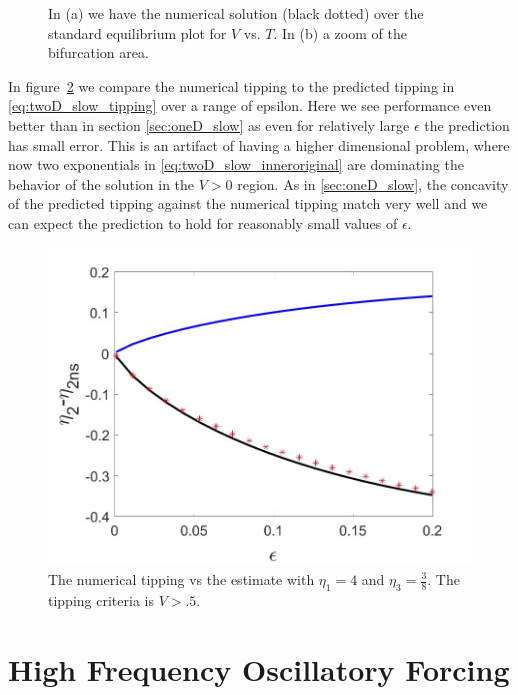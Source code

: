 \begin{figure}[H]
\begin{subfigure}{.5\textwidth}
  \caption{}
\end{subfigure}
\caption{In (a) we have the numerical solution (black dotted) over the standard equilibrium plot for $V$ vs. $T$. In (b) a zoom of the bifurcation area.}
\label{fig:twoD_slow_Tnumerics}
\end{figure}

In figure~\ref{fig:twoD_slow_epscomp} we compare the numerical tipping to the predicted tipping in \eqref{eq:twoD_slow_tipping} over a range of epsilon. Here we see performance even better than in section \autoref{sec:oneD_slow} as even for relatively large $\epsilon$ the prediction has small error. This is an artifact of having a higher dimensional problem, where now two exponentials in \eqref{eq:twoD_slow_inneroriginal} are dominating the behavior of the solution in the $V>0$ region. As in \autoref{sec:oneD_slow}, the concavity of the predicted tipping against the numerical tipping match very well and we can expect the prediction to hold for reasonably small values of $\epsilon$.

\begin{figure}[H]
\centering
\includegraphics[width=\linewidth]{twoD/slow_epscomp.jpg}
\caption{The numerical tipping vs the estimate with $\eta_1=4$ and $\eta_3=\frac{3}{8}$. The tipping criteria is $V>.5$.}
\label{fig:twoD_slow_epscomp}
\end{figure}

\section{High Frequency Oscillatory Forcing}
\label{sec:twoD_highfreqosc}

